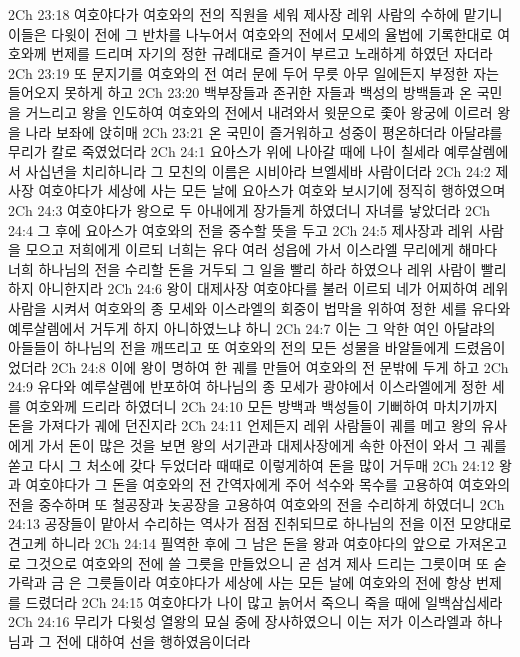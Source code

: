 2Ch 23:18  여호야다가 여호와의 전의 직원을 세워 제사장 레위 사람의 수하에 맡기니 이들은 다윗이 전에 그 반차를 나누어서 여호와의 전에서 모세의 율법에 기록한대로 여호와께 번제를 드리며 자기의 정한 규례대로 즐거이 부르고 노래하게 하였던 자더라
2Ch 23:19  또 문지기를 여호와의 전 여러 문에 두어 무릇 아무 일에든지 부정한 자는 들어오지 못하게 하고
2Ch 23:20  백부장들과 존귀한 자들과 백성의 방백들과 온 국민을 거느리고 왕을 인도하여 여호와의 전에서 내려와서 윗문으로 좇아 왕궁에 이르러 왕을 나라 보좌에 앉히매
2Ch 23:21  온 국민이 즐거워하고 성중이 평온하더라 아달랴를 무리가 칼로 죽였었더라
2Ch 24:1  요아스가 위에 나아갈 때에 나이 칠세라 예루살렘에서 사십년을 치리하니라 그 모친의 이름은 시비아라 브엘세바 사람이더라
2Ch 24:2  제사장 여호야다가 세상에 사는 모든 날에 요아스가 여호와 보시기에 정직히 행하였으며
2Ch 24:3  여호야다가 왕으로 두 아내에게 장가들게 하였더니 자녀를 낳았더라
2Ch 24:4  그 후에 요아스가 여호와의 전을 중수할 뜻을 두고
2Ch 24:5  제사장과 레위 사람을 모으고 저희에게 이르되 너희는 유다 여러 성읍에 가서 이스라엘 무리에게 해마다 너희 하나님의 전을 수리할 돈을 거두되 그 일을 빨리 하라 하였으나 레위 사람이 빨리 하지 아니한지라
2Ch 24:6  왕이 대제사장 여호야다를 불러 이르되 네가 어찌하여 레위 사람을 시켜서 여호와의 종 모세와 이스라엘의 회중이 법막을 위하여 정한 세를 유다와 예루살렘에서 거두게 하지 아니하였느냐 하니
2Ch 24:7  이는 그 악한 여인 아달랴의 아들들이 하나님의 전을 깨뜨리고 또 여호와의 전의 모든 성물을 바알들에게 드렸음이었더라
2Ch 24:8  이에 왕이 명하여 한 궤를 만들어 여호와의 전 문밖에 두게 하고
2Ch 24:9  유다와 예루살렘에 반포하여 하나님의 종 모세가 광야에서 이스라엘에게 정한 세를 여호와께 드리라 하였더니
2Ch 24:10  모든 방백과 백성들이 기뻐하여 마치기까지 돈을 가져다가 궤에 던진지라
2Ch 24:11  언제든지 레위 사람들이 궤를 메고 왕의 유사에게 가서 돈이 많은 것을 보면 왕의 서기관과 대제사장에게 속한 아전이 와서 그 궤를 쏟고 다시 그 처소에 갖다 두었더라 때때로 이렇게하여 돈을 많이 거두매
2Ch 24:12  왕과 여호야다가 그 돈을 여호와의 전 간역자에게 주어 석수와 목수를 고용하여 여호와의 전을 중수하며 또 철공장과 놋공장을 고용하여 여호와의 전을 수리하게 하였더니
2Ch 24:13  공장들이 맡아서 수리하는 역사가 점점 진취되므로 하나님의 전을 이전 모양대로 견고케 하니라
2Ch 24:14  필역한 후에 그 남은 돈을 왕과 여호야다의 앞으로 가져온고로 그것으로 여호와의 전에 쓸 그릇을 만들었으니 곧 섬겨 제사 드리는 그릇이며 또 숟가락과 금 은 그릇들이라 여호야다가 세상에 사는 모든 날에 여호와의 전에 항상 번제를 드렸더라
2Ch 24:15  여호야다가 나이 많고 늙어서 죽으니 죽을 때에 일백삼십세라
2Ch 24:16  무리가 다윗성 열왕의 묘실 중에 장사하였으니 이는 저가 이스라엘과 하나님과 그 전에 대하여 선을 행하였음이더라
